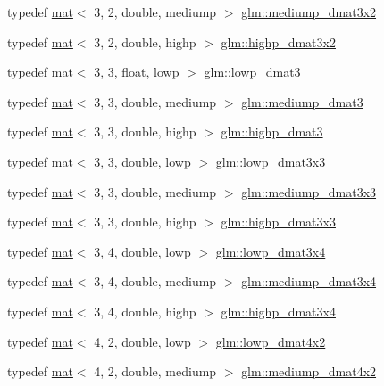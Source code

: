\begin{DoxyCompactItemize}
typedef \hyperlink{structglm_1_1mat}{mat}$<$ 3, 2, double, mediump $>$ \hyperlink{group__core__precision_gaefc11f3917dc7882f4399a47393792fa}{glm\+::mediump\+\_\+dmat3x2}
\item 
typedef \hyperlink{structglm_1_1mat}{mat}$<$ 3, 2, double, highp $>$ \hyperlink{group__core__precision_ga8454b92a3917b17a8663f2409cb3100d}{glm\+::highp\+\_\+dmat3x2}
\item 
typedef \hyperlink{structglm_1_1mat}{mat}$<$ 3, 3, float, lowp $>$ \hyperlink{group__core__precision_ga2e700c380867b8d935f2c9ea40c9ca16}{glm\+::lowp\+\_\+dmat3}
\item 
typedef \hyperlink{structglm_1_1mat}{mat}$<$ 3, 3, double, mediump $>$ \hyperlink{group__core__precision_gaf1be0a781d33d2450a31e64e09d8d18f}{glm\+::mediump\+\_\+dmat3}
\item 
typedef \hyperlink{structglm_1_1mat}{mat}$<$ 3, 3, double, highp $>$ \hyperlink{group__core__precision_ga2e305d56d01a4553a7fd2b6d2c580fa0}{glm\+::highp\+\_\+dmat3}
\item 
typedef \hyperlink{structglm_1_1mat}{mat}$<$ 3, 3, double, lowp $>$ \hyperlink{group__core__precision_gacc5689588709eb4ccf582f21cd9af38c}{glm\+::lowp\+\_\+dmat3x3}
\item 
typedef \hyperlink{structglm_1_1mat}{mat}$<$ 3, 3, double, mediump $>$ \hyperlink{group__core__precision_ga8ecaed5443b0aa73bbe8683fcbb04f65}{glm\+::mediump\+\_\+dmat3x3}
\item 
typedef \hyperlink{structglm_1_1mat}{mat}$<$ 3, 3, double, highp $>$ \hyperlink{group__core__precision_gae5f677e4437523476511c84a17206ac2}{glm\+::highp\+\_\+dmat3x3}
\item 
typedef \hyperlink{structglm_1_1mat}{mat}$<$ 3, 4, double, lowp $>$ \hyperlink{group__core__precision_ga5a806e50b4cb26784620e98c8c03f03b}{glm\+::lowp\+\_\+dmat3x4}
\item 
typedef \hyperlink{structglm_1_1mat}{mat}$<$ 3, 4, double, mediump $>$ \hyperlink{group__core__precision_ga8e38f500f63f5caed06699264acfb456}{glm\+::mediump\+\_\+dmat3x4}
\item 
typedef \hyperlink{structglm_1_1mat}{mat}$<$ 3, 4, double, highp $>$ \hyperlink{group__core__precision_ga21d3883c59ff3949404de6713e86c89e}{glm\+::highp\+\_\+dmat3x4}
\item 
typedef \hyperlink{structglm_1_1mat}{mat}$<$ 4, 2, double, lowp $>$ \hyperlink{group__core__precision_gaa61cd1362e63979d3e17d53957d2e17f}{glm\+::lowp\+\_\+dmat4x2}
\item 
typedef \hyperlink{structglm_1_1mat}{mat}$<$ 4, 2, double, mediump $>$ \hyperlink{group__core__precision_ga0ef199d025bd14f9fc8f3ebd2b8daaa5}{glm\+::mediump\+\_\+dmat4x2}

\end{DoxyCompactItemize}
